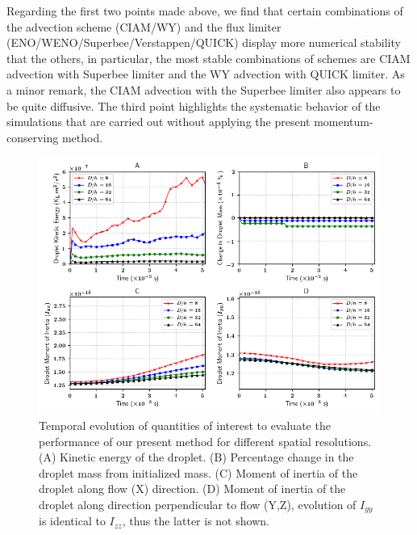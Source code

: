 Regarding the first two points made above, we find that certain combinations of the advection scheme (CIAM/WY) and the flux limiter (ENO/WENO/Superbee/Verstappen/QUICK) display more numerical stability that the others, in particular, the most stable combinations of schemes are CIAM advection with Superbee limiter and the WY advection with QUICK limiter. As a minor remark, the CIAM advection with the Superbee limiter also appears to be quite diffusive. The third point highlights the systematic behavior of the simulations that are carried out without applying the present momentum-conserving method. 

\vspace*{0.2cm}

\begin{figure}[h!]
\begin{center}
\includegraphics[scale = 0.6]{Figures/Sagar/multiplot_raindrop.png}
\end{center}
\vspace*{-0.5cm}
	\caption{Temporal evolution of quantities of interest to evaluate the performance of our present method for different spatial resolutions. (A) Kinetic energy of the droplet. (B) Percentage change in the droplet mass from initialized mass. (C) Moment of inertia of the droplet along flow (X) direction. (D) Moment of inertia of the droplet along direction perpendicular to flow (Y,Z), evolution of $I_{yy}$ is identical to $I_{zz}$, thus the latter is not shown.}
\label{multi}
\end{figure}

